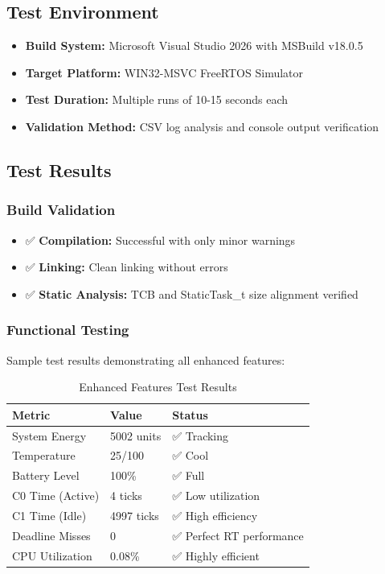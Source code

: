 \documentclass[11pt,a4paper]{article}
\begin{document}
\subsection{Test Environment}
\begin{itemize}
    \item \textbf{Build System:} Microsoft Visual Studio 2026 with MSBuild v18.0.5
    \item \textbf{Target Platform:} WIN32-MSVC FreeRTOS Simulator
    \item \textbf{Test Duration:} Multiple runs of 10-15 seconds each
    \item \textbf{Validation Method:} CSV log analysis and console output verification
\end{itemize}

\subsection{Test Results}
\subsubsection{Build Validation}
\begin{itemize}
    \item ✅ \textbf{Compilation:} Successful with only minor warnings
    \item ✅ \textbf{Linking:} Clean linking without errors
    \item ✅ \textbf{Static Analysis:} TCB and StaticTask\_t size alignment verified
\end{itemize}

\subsubsection{Functional Testing}
Sample test results demonstrating all enhanced features:

\begin{table}[h]
\centering
\begin{tabular}{|l|l|l|}
\hline
\textbf{Metric} & \textbf{Value} & \textbf{Status} \\
\hline
System Energy & 5002 units & ✅ Tracking \\
Temperature & 25/100 & ✅ Cool \\
Battery Level & 100\% & ✅ Full \\
C0 Time (Active) & 4 ticks & ✅ Low utilization \\
C1 Time (Idle) & 4997 ticks & ✅ High efficiency \\
Deadline Misses & 0 & ✅ Perfect RT performance \\
CPU Utilization & 0.08\% & ✅ Highly efficient \\
\hline
\end{tabular}
\caption{Enhanced Features Test Results}
\end{table}
\end{document}
